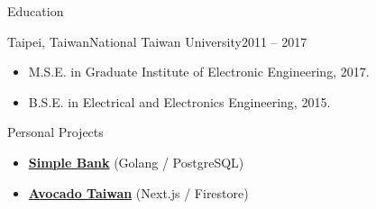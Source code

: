 \documentclass[]{mcdowellcv}
\begin{document}
	\begin{cvsection}{Education}
		\begin{cvsubsection}{Taipei, Taiwan}{National Taiwan University}{2011 -- 2017}
			\begin{itemize}
				\item M.S.E. in Graduate Institute of Electronic Engineering, 2017.
				\item B.S.E. in Electrical and Electronics Engineering, 2015.
			\end{itemize}
		\end{cvsubsection}
	\end{cvsection}
	
	\begin{cvsection}{Personal Projects}
		\begin{cvsubsection}{}{}{}
			\begin{itemize}
				\item \textbf{\href{https://github.com/hhow09/simple_bank}{Simple Bank}} (Golang / PostgreSQL)
				\item \textbf{\href{https://avocadotaiwan.com}{Avocado Taiwan}} (Next.js / Firestore)
			\end{itemize}
		\end{cvsubsection}
	\end{cvsection}
	
\end{document}
